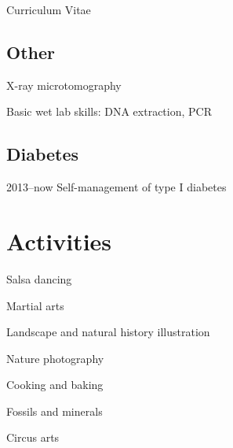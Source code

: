 \documentclass[11pt,a4paper]{article}
\begin{document}
\begin{cv}{Curriculum Vitae}
\begin{cvlist}{}
		\end{cvlist}
		
		\subsection{Other}
		
		\begin{cvlist}{}
			
			\item X-ray microtomography
			\item Basic wet lab skills: DNA extraction, PCR
			
		\end{cvlist}
	
		\subsection{Diabetes}
		
		\begin{cvlist}{}
			
			\item[2013--now] Self-management of type I diabetes
			
		\end{cvlist}
	
		\section{Activities}
		
		\begin{cvlist}{}
			
			\item Salsa dancing
			
			\item Martial arts
			
			\item Landscape and natural history illustration
			
			\item Nature photography
			
			\item Cooking and baking
			
			\item Fossils and minerals
			
			\item Circus arts
			
		\end{cvlist}
	
		
		\vfill
		\date{}
		
	\end{cv}
	
\end{document}
